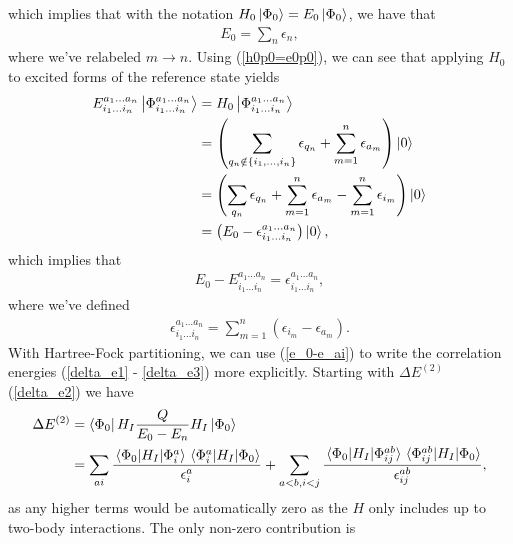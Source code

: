 \documentclass[10pt]{article}
\begin{document}
which implies that with the notation $H_0\ket{\Phi_0}=E_0\ket{\Phi_0}$, we have that
\begin{align}
E_0 = \sum_n\epsilon_n,
\end{align}
where we've relabeled $m\to n$. Using (\ref{h0p0=e0p0}), we can see that applying $H_0$ to excited forms of the reference state yields
\begin{align}
E^{a_1\ldots a_n}_{i_1\ldots i_n}\ket{\Phi^{a_1\ldots a_n}_{i_1\ldots i_n}}
&=
H_0\ket{\Phi^{a_1\ldots a_n}_{i_1\ldots i_n}}
\\
&=
\left(
\sum_{q_n\notin\{i_1,\ldots,i_n\}}\epsilon_{q_n}
+
\sum_{m=1}^n\epsilon_{a_m}
\right)
\ket{0}
\\
&=
\left(
\sum_{q_n}\epsilon_{q_n}
+
\sum_{m=1}^n\epsilon_{a_m}
-
\sum_{m=1}^n\epsilon_{i_m}
\right)
\ket{0}
\\
&=
\left(E_0-\epsilon^{a_1\ldots a_n}_{i_1\ldots i_n}\right)\ket{0},
\end{align}
which implies that
\begin{align}
\label{e_0-e_ai}
E_0-E^{a_1\ldots a_n}_{i_1\ldots i_n}=\epsilon^{a_1\ldots a_n}_{i_1\ldots i_n},
\end{align}
where we've defined
\begin{align}
\epsilon^{a_1\ldots a_n}_{i_1\ldots i_n}
=
\sum_{m=1}^n
\left(
\epsilon_{i_m}
-
\epsilon_{a_m}
\right).
\end{align}
With Hartree-Fock partitioning, we can use (\ref{e_0-e_ai}) to write the correlation energies (\ref{delta_e1} - \ref{delta_e3}) more explicitly. Starting with $\Delta E^{(2)}$ (\ref{delta_e2}) we have
\begin{align}
\Delta E^{(2)}
&=
\bra{\Phi_0}H_I\frac{Q}{E_0-E_n}H_I\ket{\Phi_0}
\\
&=
\sum_{ai}\frac{\mel*{\Phi_0}{H_I}{\Phi^{a}_{i}}\mel*{\Phi^{a}_{i}}{H_I}{\Phi_0}}{\epsilon^{a}_{i}}
+
\sum_{a<b,i<j}\frac{\mel*{\Phi_0}{H_I}{\Phi^{ab}_{ij}}\mel*{\Phi^{ab}_{ij}}{H_I}{\Phi_0}}{\epsilon^{ab}_{ij}},
\end{align}
as any higher terms would be automatically zero as the $H$ only includes up to two-body interactions. The only non-zero contribution is
\end{document}
